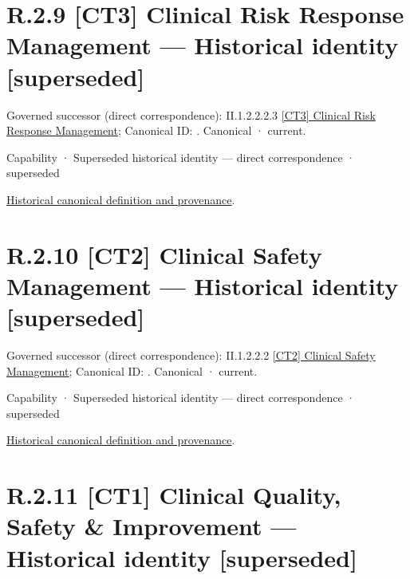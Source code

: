 \section*{R.2.9 [CT3] Clinical Risk Response Management — Historical identity [superseded]}
\label{navigation:R.2.9}

{\small Governed successor (direct correspondence): II.1.2.2.2.3 \hyperref[element:5e36cb137e4e4782b2ddbf78cdf0da7b]{[CT3] Clinical Risk Response Management}; Canonical ID: \texttt{}. Canonical · current.}\par
\label{element:20f719ab4b6741b393ef570b4d1b05df}
{\small Capability · Superseded historical identity — direct correspondence · superseded}\par
\href{../../../../continuum/strategy/capability/20f719ab4b6741b393ef570b4d1b05df.md}{Historical canonical definition and provenance}.\par
\section*{R.2.10 [CT2] Clinical Safety Management — Historical identity [superseded]}
\label{navigation:R.2.10}

{\small Governed successor (direct correspondence): II.1.2.2.2 \hyperref[element:28d1bf3e514e4c29837ebedaf9e4917b]{[CT2] Clinical Safety Management}; Canonical ID: \texttt{}. Canonical · current.}\par
\label{element:650ccec030fa46cc8c9d6b508a841778}
{\small Capability · Superseded historical identity — direct correspondence · superseded}\par
\href{../../../../continuum/strategy/capability/650ccec030fa46cc8c9d6b508a841778.md}{Historical canonical definition and provenance}.\par
\section*{R.2.11 [CT1] Clinical Quality, Safety \& Improvement — Historical identity [superseded]}
\label{navigation:R.2.11}

